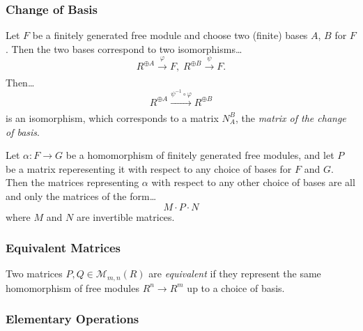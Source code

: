\subsubsection{Change of Basis}\label{changeofbasis}
Let $F$ be a finitely generated free module and choose two (finite) bases $A$, $B$ for $F$. Then the two bases correspond
to two isomorphisms\dots
$$R^{\oplus A} \xrightarrow[]{\varphi} F, \; R^{\oplus B} \xrightarrow[]{\psi} F.$$
Then\dots
$$R^{\oplus A} \xrightarrow[]{\psi^{-1} \circ \varphi} R^{\oplus B}$$
is an isomorphism, which corresponds to a matrix $N^B_A$, the \emph{matrix of the change of basis}.

\begin{proposition}
Let $\alpha : F \rightarrow G$ be a homomorphism of finitely generated free modules, and let $P$ be a matrix reperesenting
it with respect to any choice of bases for $F$ and $G$. Then the matrices representing $\alpha$ with respect to any other
choice of bases are all and only the matrices of the form\dots
$$M \cdot P \cdot N$$
where $M$ and $N$ are invertible matrices.

\subsubsection{Equivalent Matrices}\label{equivalentmatrices}
Two matrices $P, Q \in \mathcal{M}_{m,n}(R)$ are \emph{equivalent} if they represent the same homomorphism of free modules
$R^n \rightarrow R^m$ up to a choice of basis.
\end{proposition}

\subsubsection{Elementary Operations}